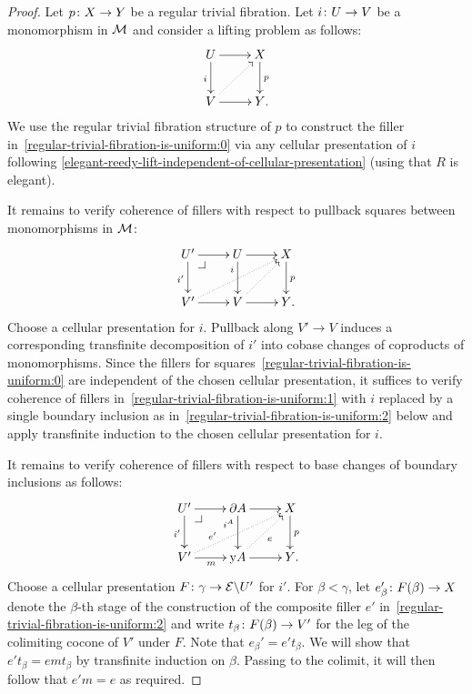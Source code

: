 \documentclass[reqno,10pt,a4paper,oneside,draft]{amsart}
\begin{document}
\begin{proof}
Let $p \co X \to Y$ be a regular trivial fibration.
Let $i \co U \to V$ be a monomorphism in $\cal{M}$ and consider a lifting problem as follows:
\begin{equation} \label{regular-trivial-fibration-is-uniform:0}
\xycenter{
  U
  \ar[d]_{i}
  \ar[r]
&
  X
  \ar[d]^{p}
\\
  V
  \ar[r]
  \ar@{.>}[ur]
&
  Y
\rlap{.}}
\end{equation}
We use the regular trivial fibration structure of $p$ to construct the filler in~\eqref{regular-trivial-fibration-is-uniform:0} via any cellular presentation of $i$ following \cref{elegant-reedy-lift-independent-of-cellular-presentation} (using that $R$ is elegant).

It remains to verify coherence of fillers with respect to pullback squares between monomorphisms in $\cal{M}$:
\begin{equation} \label{regular-trivial-fibration-is-uniform:1}
\xycenter{
  U'
  \ar[d]_{i'}
  \ar[r]
  \pullback{dr}
&
  U
  \ar[d]_(0.3){i}
  \ar[r]
&
  X
  \ar[d]^{p}
\\
  V'
  \ar[r]
  \ar@{.>}[urr]
&
  V
  \ar[r]
  \ar@{.>}[ur]
&
  Y
\rlap{.}}
\end{equation}
Choose a cellular presentation for $i$.
Pullback along $V' \to V$ induces a corresponding transfinite decomposition of $i'$ into cobase changes of coproducts of monomorphisms.
Since the fillers for squares~\eqref{regular-trivial-fibration-is-uniform:0} are independent of the chosen cellular presentation, it suffices to verify coherence of fillers in~\eqref{regular-trivial-fibration-is-uniform:1} with $i$ replaced by a single boundary inclusion as in~\eqref{regular-trivial-fibration-is-uniform:2} below and apply transfinite induction to the chosen cellular presentation for $i$.

It remains to verify coherence of fillers with respect to base changes of boundary inclusions as follows:
\begin{equation} \label{regular-trivial-fibration-is-uniform:2}
\xycenter{
  U'
  \ar[d]_{i'}
  \ar[r]
  \pullback{dr}
&
  \partial A
  \ar[d]_(0.3){i^A}
  \ar[r]
&
  X
  \ar[d]^{p}
\\
  V'
  \ar[r]_{m}
  \ar@{.>}[urr]^(0.3){e'}
&
  \yon A
  \ar[r]
  \ar@{.>}[ur]_{e}
&
  Y
\rlap{.}}
\end{equation}
Choose a cellular presentation $F \co \gamma \to \catE \backslash U'$ for $i'$.
For $\beta < \gamma$, let $e_{\beta}' \co F(\beta) \to X$ denote the $\beta$-th stage of the construction of the composite filler $e'$ in~\eqref{regular-trivial-fibration-is-uniform:2} and write $t_{\beta} \co F(\beta) \to V'$ for the leg of the colimiting cocone of $V'$ under $F$.
Note that $e_{\beta}' = e' t_{\beta}$.
We will show that $e' t_{\beta} = e m t_{\beta}$ by transfinite induction on $\beta$.
Passing to the colimit, it will then follow that $e' m = e$ as required.


\end{proof}
\end{document}
